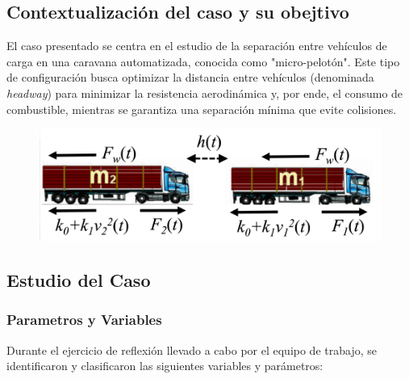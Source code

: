\documentclass[11pt,stdletter,orderfromtodate,sigleft,twoside]{report}
\begin{document}
\subsection{Contextualización del caso y su obejtivo}

El caso presentado se centra en el estudio de la separación entre vehículos de carga en una caravana automatizada, conocida como "micro-pelotón". Este tipo de configuración busca optimizar la distancia entre vehículos (denominada \textit{headway}) para minimizar la resistencia aerodinámica y, por ende, el consumo de combustible, mientras se garantiza una separación mínima que evite colisiones.

\begin{figure}[H]
    \centering
    \includegraphics[width=0.75\linewidth]{Contexto 2do punto.png}
\end{figure}

\subsection{Estudio del Caso}

\subsubsection{Parametros y Variables}

Durante el ejercicio de reflexión llevado a cabo por el equipo de trabajo, se identificaron y clasificaron las siguientes variables y parámetros:
\end{document}
